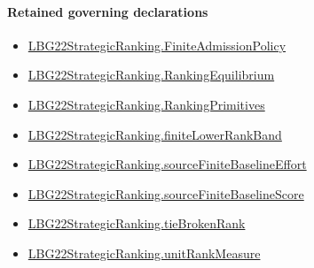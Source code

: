 \documentclass[10pt]{article}
\begin{document}
\paragraph{Retained governing declarations}
\begin{itemize}\raggedright
\item \hyperlink{paper-prerequisite-d056dd7c8060653c}{LBG22\allowbreak{}Strategic\allowbreak{}Ranking.\allowbreak{}Finite\allowbreak{}Admission\allowbreak{}Policy}
\item \hyperlink{paper-prerequisite-2a1b692f4e3136c6}{LBG22\allowbreak{}Strategic\allowbreak{}Ranking.\allowbreak{}Ranking\allowbreak{}Equilibrium}
\item \hyperlink{paper-prerequisite-9bbcc12f4a1736bf}{LBG22\allowbreak{}Strategic\allowbreak{}Ranking.\allowbreak{}Ranking\allowbreak{}Primitives}
\item \hyperlink{paper-prerequisite-a42f440ddc254fa7}{LBG22\allowbreak{}Strategic\allowbreak{}Ranking.\allowbreak{}finite\allowbreak{}Lower\allowbreak{}Rank\allowbreak{}Band}
\item \hyperlink{governing-declaration-a63079aa3a21a0d6}{LBG22\allowbreak{}Strategic\allowbreak{}Ranking.\allowbreak{}source\allowbreak{}Finite\allowbreak{}Baseline\allowbreak{}Effort}
\item \hyperlink{governing-declaration-927fd67abc7df008}{LBG22\allowbreak{}Strategic\allowbreak{}Ranking.\allowbreak{}source\allowbreak{}Finite\allowbreak{}Baseline\allowbreak{}Score}
\item \hyperlink{paper-prerequisite-b7c71e53177b76c6}{LBG22\allowbreak{}Strategic\allowbreak{}Ranking.\allowbreak{}tie\allowbreak{}Broken\allowbreak{}Rank}
\item \hyperlink{governing-declaration-678cf48d549cb620}{LBG22\allowbreak{}Strategic\allowbreak{}Ranking.\allowbreak{}unit\allowbreak{}Rank\allowbreak{}Measure}
\end{itemize}
\end{document}

